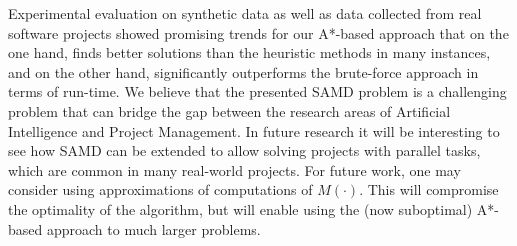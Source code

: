 \documentclass[letterpaper]{article} %
\newcommand{\samd}{\ac{SAMD}\xspace}
\newcommand{\astar}{\textsc{A*}\xspace}
\newcommand{\optapprox}{\textsc{OptApprox}\xspace}
\begin{document}
Experimental evaluation on synthetic data as well as data collected from real software projects showed promising trends for our \astar-based approach that on the one hand, finds better solutions than the heuristic methods in many instances, and on the other hand, significantly outperforms the brute-force approach in terms of run-time.
We believe that the presented \samd problem is a challenging problem that can bridge the gap between the research areas of Artificial Intelligence and Project Management. In future research it will be interesting to see how \samd can be extended to allow solving projects with parallel tasks, which are common in many real-world projects.
For future work, one may consider using approximations of computations of $M(\cdot)$.
This will compromise the optimality of the algorithm, but will enable using the (now suboptimal) \astar-based approach to much larger problems.



\end{document}
